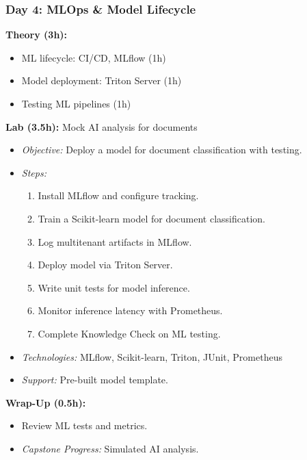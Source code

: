 \documentclass[11pt]{article}
\begin{document}
\subsubsection{Day 4: MLOps \& Model Lifecycle}
\textbf{Theory (3h):}
\begin{itemize}
    \item ML lifecycle: CI/CD, MLflow (1h)
    \item Model deployment: Triton Server (1h)
    \item Testing ML pipelines (1h)
\end{itemize}
\textbf{Lab (3.5h):} Mock AI analysis for documents
\begin{itemize}
    \item \textit{Objective:} Deploy a model for document classification with testing.
    \item \textit{Steps:}
        \begin{enumerate}
            \item Install MLflow and configure tracking.
            \item Train a Scikit-learn model for document classification.
            \item Log multitenant artifacts in MLflow.
            \item Deploy model via Triton Server.
            \item Write unit tests for model inference.
            \item Monitor inference latency with Prometheus.
            \item Complete Knowledge Check on ML testing.
        \end{enumerate}
    \item \textit{Technologies:} MLflow, Scikit-learn, Triton, JUnit, Prometheus
    \item \textit{Support:} Pre-built model template.
\end{itemize}
\textbf{Wrap-Up (0.5h):}
\begin{itemize}
    \item Review ML tests and metrics.
    \item \textit{Capstone Progress:} Simulated AI analysis.
\end{itemize}
\end{document}
